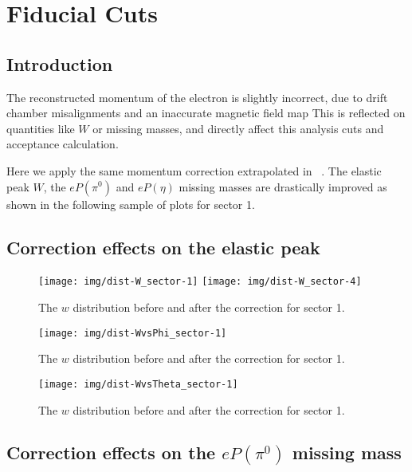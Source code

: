 \section{Fiducial Cuts}

\subsection{Introduction}

The reconstructed momentum of the electron is slightly incorrect, due to
drift chamber misalignments and an inaccurate magnetic field map
This is reflected on quantities like $W$ or missing masses, and directly affect this
analysis cuts and acceptance calculation.

Here we apply the same momentum correction extrapolated in ~\cite{bib:pi0_Delta}.
The elastic peak $W$, the $eP(\pi^0)$ and $eP(\eta)$ missing masses
are drastically improved as shown in the following sample of plots for sector 1.


\subsection{Correction effects on the elastic peak}

\begin{figure}[h]
    \centering
    \texttt{[image: img/dist-W\_sector-1]}
    \texttt{[image: img/dist-W\_sector-4]}
    \caption{The $w$ distribution before and after the correction for sector 1.}
    \label{fig:dist-W_sector-1}
\end{figure}

\begin{figure}[h]
    \centering
    \texttt{[image: img/dist-WvsPhi\_sector-1]}
    \caption{The $w$ distribution before and after the correction for sector 1.}
    \label{fig:dist-WvsPhi_sector-1}
\end{figure}

\begin{figure}[h]
    \centering
    \texttt{[image: img/dist-WvsTheta\_sector-1]}
    \caption{The $w$ distribution before and after the correction for sector 1.}
    \label{fig:dist-WvsTheta_sector-1}
\end{figure}


\clearpage\newpage
\subsection{Correction effects on the $eP(\pi^0)$ missing mass}

